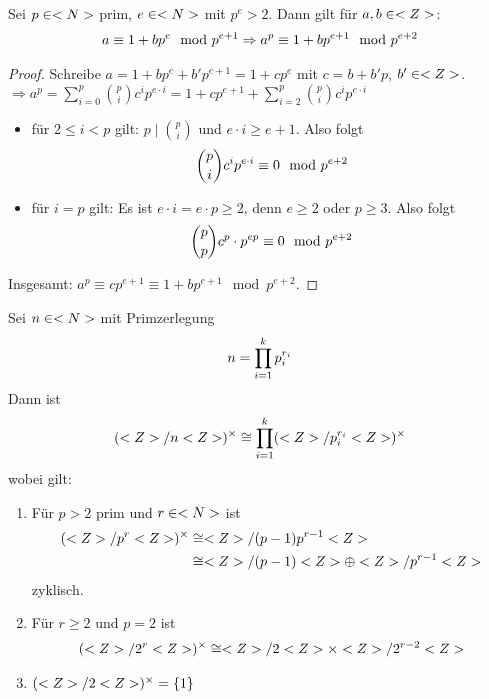 \begin{lemma}
	Sei $p \in <N>$ prim, $e \in <N>$ mit $p^{e} > 2$. Dann gilt für $a,b \in <Z>$:
	\begin{align}
		a \equiv 1 + bp^{e} \mod p^{e+1} \Rightarrow a^p \equiv 1 + bp^{e+1} \mod p^{e+2} \notag
	\end{align}
\end{lemma}

\begin{proof}
	Schreibe $a= 1 + bp^{e} + b'p^{e+1} = 1 + cp^{e}$ mit $c = b + b'p$, $b' \in <Z>$.\\
	$\Rightarrow a^p = \sum_{i=0}^{p} \binom{p}{i} c^i p^{e\cdot i} = 1+cp^{e+1} + \sum_{i=2}^{p} \binom{p}{i} c^i p^{e\cdot i}$
	\begin{itemize}
		\item für $2 \le i < p$ gilt: $p \mid \binom{p}{i}$ und $e\cdot i \ge e + 1$. Also folgt
		\begin{align}
			\binom{p}{i}c^i p^{e\cdot i} \equiv 0 \mod p^{e + 2} \notag
		\end{align}
		\item für $i = p$ gilt: Es ist $e\cdot i = e\cdot p \ge 2$, denn $e \ge 2$ oder $p \ge 3$. Also folgt
		\begin{align}
			\binom{p}{p}c^{p}\cdot p^{ep} \equiv 0 \mod p^{e+2}\notag
		\end{align}
	\end{itemize}
	Insgesamt: $a^p \equiv cp^{e+1} \equiv 1 + bp^{e+1} \mod p^{e+2}$.
\end{proof}

\begin{theorem}
	Sei $n \in <N>$ mit Primzerlegung
	\begin{align}
		n = \prod_{i=1}^{k} p_i^{r_i}\notag
	\end{align}
	Dann ist
	\begin{align}
		(<Z> / n <Z>)^{\times} \cong \prod_{i=1}^{k} (<Z> / p_i^{r_i} <Z>)^{\times}\notag
	\end{align}
	wobei gilt:
	\begin{enumerate}[label=(\alph*)]
		\item Für $p > 2$ prim und $r \in <N>$ ist
		\begin{align}
			(<Z> / p^{r}<Z>)^{\times} &\cong <Z> / (p-1)p^{r-1}<Z> \notag \\
			&\cong <Z> / (p-1) <Z> \oplus <Z> / p^{r-1} <Z> \notag
		\end{align} 
		zyklisch.
		\item Für $r \ge 2$ und $p =2$ ist
		\begin{align}
			(<Z> /2^r <Z>)^{\times} \cong <Z> / 2 <Z> \times <Z> / 2^{r-2}<Z> \notag
		\end{align}
		\item $(<Z> / 2 <Z>)^{\times} = \{1\}$
	\end{enumerate}
\end{theorem}


